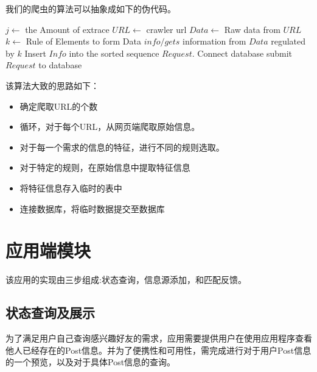 我们的爬虫的算法可以抽象成如下的伪代码。

\begin{codebox}
\li \For $j \gets $ \To the Amount of extrace \label{li:for}
\li     \Do \label{li:for-begin}
\li 	$URL \gets$ crawler url 
\li 	$Data \gets$ Raw data from $URL$
\li 	\For $k \gets$ Rule of Elements to form Data \label{li:for}
\li     	\Do \label{li:for-begin}
\li 		$info /gets$ information from $Data$ regulated by $k$
\li      	Insert $Info$ into the sorted sequence $Request$.
\label{li:for-end}
                \End
\li         Connect database submit $Request$ to database       \label{li:for-end}
        \End
\end{codebox}

该算法大致的思路如下：
\begin{itemize}
\item 确定爬取URL的个数
\item 循环，对于每个URL，从网页端爬取原始信息。
\item 对于每一个需求的信息的特征，进行不同的规则选取。
\item 对于特定的规则，在原始信息中提取特征信息
\item 将特征信息存入临时的表中
\item 连接数据库，将临时数据提交至数据库
\end{itemize}


\section{应用端模块}
该应用的实现由三步组成:状态查询，信息源添加，和匹配反馈。


\subsection{状态查询及展示}
为了满足用户自己查询感兴趣好友的需求，应用需要提供用户在使⽤应⽤程序查看他人已经存在的Post信息。并为了便携性和可用性，需完成进行对于用户Post信息的一个预览，以及对于具体Post信息的查询。

